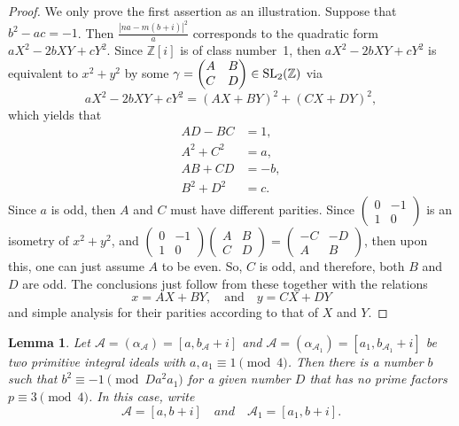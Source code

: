 \documentclass[11pt, reqno]{amsart}
\theoremstyle{plain}
\newtheorem{lemma}[theorem]{Lemma}
\theoremstyle{definition}
\numberwithin{equation}{section}
\def\C{\mathbb{C}}
\begin{document}
\begin{proof}
We only prove the first assertion as an illustration.    Suppose that $b^{2}-ac=-1$. Then
$\frac{|na-m(b+i)|^{2}}{a}$ corresponds to the quadratic form $aX^{2}-2bXY+cY^{2}$. Since $\mathbb{Z}[i]$ is of class number~1, then $aX^{2}-2bXY+cY^{2}$ is equivalent to $x^{2}+y^{2}$ by some $\gamma=\begin{pmatrix}
    A&B\\C&D
\end{pmatrix}\in {\rm SL}_{2}(\mathbb{Z})$ via 
$$
aX^{2}-2bXY+cY^{2}=(AX+BY)^{2}+(CX+DY)^{2},
$$
 which yields that
\begin{align*}
    AD-BC&=1,\\
    A^{2}+C^{2}&=a,\\
    AB+CD&=-b,\\
    B^{2}+D^{2}&=c.
\end{align*}
Since $a$ is odd, then $A$ and $C$ must have different parities. Since $\begin{pmatrix}
    0&-1\\1&0
\end{pmatrix}$
is an isometry of $x^{2}+y^{2}$, and $\begin{pmatrix}
    0&-1\\1&0
\end{pmatrix}\begin{pmatrix}
    A&B\\C&D
\end{pmatrix}=\begin{pmatrix}
    -C&-D\\A&B
\end{pmatrix}$, then upon this, one can just assume $A$ to be even. So, $C$ is odd, and therefore, both $B$ and $D$ are odd. The conclusions  just follow from these together with the relations
$$
x=AX+BY,\quad\mbox{and}\quad y=CX+DY
$$
and simple analysis for their parities according to that of $X$ and $Y$.
\end{proof}




\begin{lemma}\label{lemaab}
    Let  $\mathcal{A}=(\alpha_{\mathcal{A}})=[a,b_{\mathcal{A}}+i]$ and $\mathcal{A}=(\alpha_{\mathcal{A}_{1}})=[a_{1},b_{\mathcal{A}_{1}}+i]$ be two primitive integral ideals with $a,a_{1}\equiv1\pmod{4}$. Then there is a number $b$ such that $b^{2}\equiv-1\pmod{Da^{2}a_{1}}$ for a given number $D$ that has no prime factors~$p\equiv3\pmod{4}$. In this case, write
    $$
    \mathcal{A}=[a,b+i]\quad{and}\quad \mathcal{A}_{1}=[a_{1},b+i].
    $$
\end{lemma}
\end{document}
